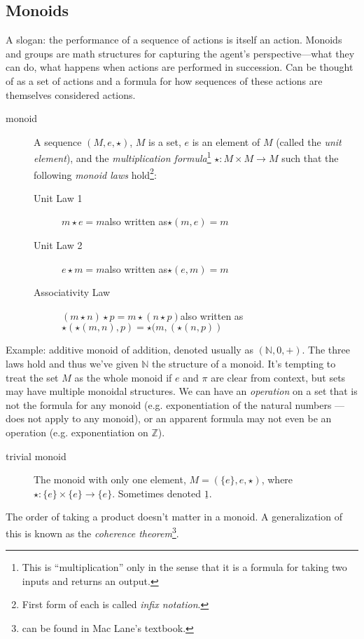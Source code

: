 \documentclass{article}
\begin{document}
\subsection{Monoids}
A slogan: the performance of a sequence of actions is itself an action.
Monoids and groups are math structures for capturing the agent's perspective---what they can do, what happens when actions are performed in succession. Can be thought of as a set of actions and a formula for how sequences of these actions are themselves considered actions.

\begin{description}
\item[monoid] A sequence $(M,e,\star)$, $M$ is a set, $e$ is an element of $M$ (called the \emph{unit element}), and the \emph{multiplication formula}\footnote{This is ``multiplication'' only in the sense that it is a formula for taking two inputs and returns an output.} $\star: M \times M \rightarrow M$ such that the following \emph{monoid laws} hold\footnote{First form of each is called \emph{infix notation}.}:
\begin{description}
\item[Unit Law 1] $m \star e = m$\quad also written as\quad $\star(m,e) = m$
\item[Unit Law 2] $e \star m = m$\quad also written as\quad $\star(e,m) = m$
\item[Associativity Law] $(m \star n) \star p = m \star (n \star p)$\quad also written as\quad $\star(\star(m,n),p) = \star(m,(\star(n,p))$
\end{description}
\end{description}
Example: additive monoid of addition, denoted usually as $(\mathbb{N}, 0, +)$. The three laws hold and thus we've given $\mathbb{N}$ the structure of a monoid.
It's tempting to treat the set $M$ as the whole monoid if $e$ and $\pi$ are clear from context, but sets may have multiple monoidal structures. We can have an \emph{operation} on a set that is not the formula for any monoid (e.g. exponentiation of the natural numbers --- does not apply to any monoid), or an apparent formula may not even be an operation (e.g. exponentiation on $\mathbb{Z}$).
\begin{description}
\item[trivial monoid] The monoid with only one element, $M = (\{e\},e,\star)$, where $\star: \{e\} \times \{e\} \rightarrow \{e\}$. Sometimes denoted $\underline{1}$.
\end{description}
The order of taking a product doesn't matter in a monoid. A generalization of this is known as the \emph{coherence theorem}\footnote{can be found in Mac Lane's textbook.}.
\end{document}
